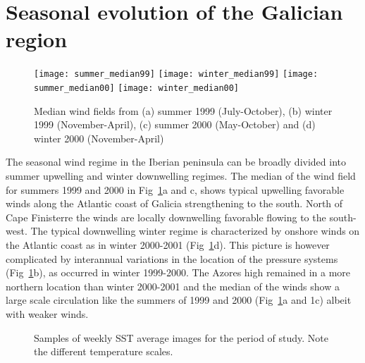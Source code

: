 \section{Seasonal evolution of the Galician region}
\begin{figure}[t]
\noindent
\texttt{[image: summer\_median99]}
\texttt{[image: winter\_median99]}
\texttt{[image: summer\_median00]}
\texttt{[image: winter\_median00]}
\caption{Median wind fields from (a) summer 1999 (July-October),
(b) winter 1999 (November-April), (c) summer 2000 (May-October)
and (d) winter 2000 (November-April)}\label{fig:windsmedian}
\end{figure}
The seasonal wind regime in the Iberian peninsula can be broadly
divided into summer upwelling and winter downwelling regimes. The
median of the wind field for summers 1999 and 2000 in
{Fig~\ref{fig:windsmedian}}a and c, shows typical upwelling
favorable winds along the Atlantic coast of Galicia strengthening
to the south. North of Cape Finisterre the winds are locally
downwelling favorable flowing to the south-west. The typical
downwelling winter regime is characterized by onshore winds on the
Atlantic coast as in winter 2000-2001
(Fig~\ref{fig:windsmedian}d). This picture is however complicated
by interannual variations in the location of the pressure systems
(Fig~\ref{fig:windsmedian}b), as occurred in winter 1999-2000. The
Azores high remained in a more northern location than winter
2000-2001 and the median of the winds show a large scale
circulation like the summers of 1999 and 2000
(Fig~\ref{fig:windsmedian}a and 1c) albeit with weaker winds.
\begin{figure}
%
%
%
%
\caption{Samples of weekly SST average images for the period of
study. Note the different temperature scales.}
\label{fig:windssstsummary}
\end{figure}

